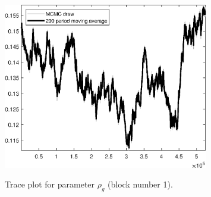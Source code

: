 \begin{figure}[H]
\centering
  \includegraphics[width=0.8\textwidth]{BRS_growth_KPR/graphs/TracePlot_rho_g_blck_1}\\
    \caption{Trace plot for parameter ${\rho_g}$ (block number 1).}
\end{figure}
